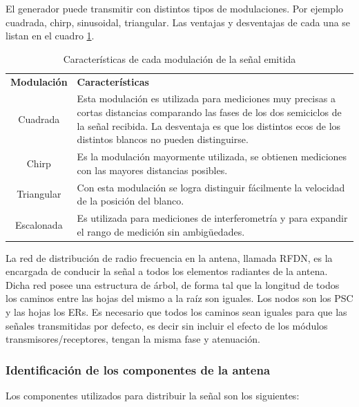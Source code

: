 El generador puede transmitir con distintos tipos de modulaciones. Por ejemplo cuadrada, chirp, sinusoidal, triangular. Las ventajas y
desventajas de cada una se listan en el cuadro \ref{tab:modulations}.

\begin{table}[H]
  \footnotesize
  \centering
  \begin{tabular}{|c|p{9cm}|}
	\hline
	\textbf{Modulación} & \textbf{Características} \\
	Cuadrada & Esta modulación es utilizada para mediciones muy precisas a cortas distancias comparando las fases de los dos
	semiciclos de la señal recibida. La desventaja es que los distintos ecos de los distintos blancos no pueden distinguirse.\\\hline
	Chirp & Es la modulación mayormente utilizada, se obtienen mediciones con las mayores distancias posibles.\\\hline
	Triangular & Con esta modulación se logra distinguir fácilmente la velocidad de la posición del blanco. \\\hline
	Escalonada & Es utilizada para mediciones de interferometría y para expandir el rango de medición sin ambig\"uedades.\\\hline
  \end{tabular}
  \caption{Características de cada modulación de la señal emitida}
  \label{tab:modulations}
\end{table}

La red de distribución de radio frecuencia en la antena, llamada RFDN, es la encargada de conducir la señal a todos los 
elementos radiantes de la antena. Dicha red posee una estructura de árbol, de forma tal que la longitud de todos los caminos
entre las hojas del mismo a la raíz son iguales. Los nodos son los PSC y las hojas los ERs. Es necesario que todos los caminos
sean iguales para que las señales transmitidas por defecto, es decir sin incluir el efecto de los módulos 
transmisores/receptores, tengan la misma fase y atenuación. 


\subsubsection{Identificación de los componentes de la antena}

Los componentes utilizados para distribuir la señal son los siguientes:

